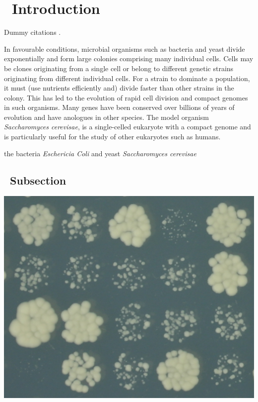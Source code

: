 \graphicspath{{images/}}

\section{\thesection~Introduction}
\label{sec:introduction}


Dummy \citet{Lawless2010} citations \citep{Heydari2016} \citep{Addinall2008}.

In favourable conditions, microbial organisms such as bacteria and
yeast divide exponentially and form large colonies comprising many
individual cells. Cells may be clones originating from a single cell
or belong to different genetic strains originating from different
individual cells. For a strain to dominate a population, it must (use
nutrients efficiently and) divide faster than other strains in the
colony. This has led to the evolution of rapid cell division and
compact genomes in such organisms. Many genes have been conserved over
billions of years of evolution and have anologues in other
species. The model organism \textit{Saccharomyces cerevisae}, is a
single-celled eukaryote with a compact genome and is particularly
useful for the study of other eukaryotes such as humans.


the bacteria \textit{Eschericia Coli} and yeast \textit{Saccharomyces cerevisae}


\subsection{\thesubsection~Subsection}

\begin{Figure}
  \centering
  \includegraphics[width=\linewidth]{p15_section/p15_section}
  \label{fig:p15_section}
\end{Figure}


